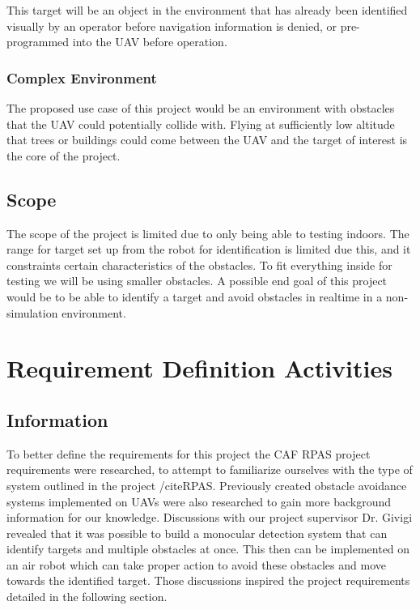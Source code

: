 \documentclass[]{report}
\begin{document}
This target will be an object in the environment that has already been identified visually by an operator before navigation information is denied, or pre-programmed into the UAV before operation.

\subsection{Complex Environment}

The proposed use case of this project would be an environment with obstacles that the UAV could potentially collide with. Flying at sufficiently low altitude that trees or buildings could come between the UAV and the target of interest is the core of the project.


\section{Scope}
The scope of the project is limited due to only being able to testing indoors. The range for target set up from the robot for identification is limited due this, and it constraints certain characteristics of the obstacles. To fit everything inside for testing we will be using smaller obstacles. A possible end goal of this project would be to be able to identify a target and avoid obstacles in realtime in a non-simulation environment. 

\chapter{Requirement Definition Activities}

\section{Information}

To better define the requirements for this project the CAF RPAS project requirements were researched, to attempt to familiarize ourselves with the type of system outlined in the project /cite{RPAS}. Previously created obstacle avoidance systems implemented on UAVs were also researched to gain more background information for our knowledge.
Discussions with our project supervisor Dr. Givigi revealed that it was possible to build a monocular detection system that can identify targets and multiple obstacles at once. This then can be implemented on an air robot which can take proper action to avoid these obstacles and move towards the identified target. Those discussions inspired the project requirements detailed in the following section.
\end{document}
